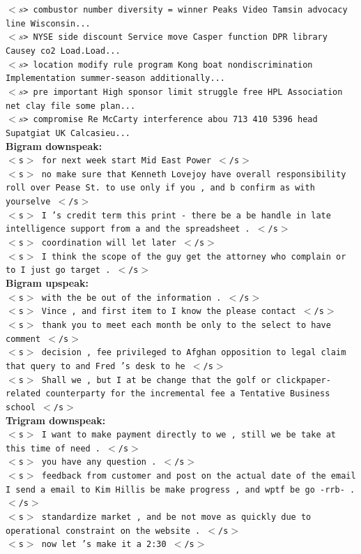 \documentclass{article} %
\begin{document}
\texttt{$<s$> combustor number diversity = winner Peaks Video Tamsin advocacy line Wisconsin...\\
$<s$> NYSE side discount Service move Casper function DPR library Causey co2 Load.Load...\\
$<s$> location modify rule program Kong boat nondiscrimination Implementation summer-season additionally...\\
$<s$> pre important High sponsor limit struggle free HPL Association net clay file some plan...\\
$<s$> compromise Re McCarty interference abou 713 410 5396 head Supatgiat UK Calcasieu...}\\

\textbf{Bigram downspeak:}\\

\texttt{$<$s$>$ for next week start Mid East Power $<$/s$>$\\
$<$s$>$ no make sure that Kenneth Lovejoy have overall responsibility roll over Pease St. to use only if you , and b confirm as with yourselve $<$/s$>$\\
$<$s$>$ I 's credit term this print - there be a be handle in late intelligence support from a and the spreadsheet . $<$/s$>$\\
$<$s$>$ coordination will let later $<$/s$>$\\
$<$s$>$ I think the scope of the guy get the attorney who complain or to I just go target . $<$/s$>$}\\

\textbf{Bigram upspeak: }\\

\texttt{$<$s$>$ with the be out of the information . $<$/s$>$\\
$<$s$>$ Vince , and first item to I know the please contact $<$/s$>$\\
$<$s$>$ thank you to meet each month be only to the select to have comment $<$/s$>$\\
$<$s$>$ decision , fee privileged to Afghan opposition to legal claim that query to and Fred 's desk to he $<$/s$>$\\
$<$s$>$ Shall we , but I at be change that the golf or clickpaper-related counterparty for the incremental fee a Tentative Business school $<$/s$>$}\\

\textbf{Trigram downspeak:}\\

\texttt{$<$s$>$ I want to make payment directly to we , still we be take at this time of need . $<$/s$>$\\
$<$s$>$ you have any question . $<$/s$>$\\
$<$s$>$ feedback from customer and post on the actual date of the email I send a email to Kim Hillis be make progress , and wptf be go -rrb- . $<$/s$>$\\
$<$s$>$ standardize market , and be not move as quickly due to operational constraint on the website . $<$/s$>$\\
$<$s$>$ now let 's make it a 2:30 $<$/s$>$}\\
\end{document}
